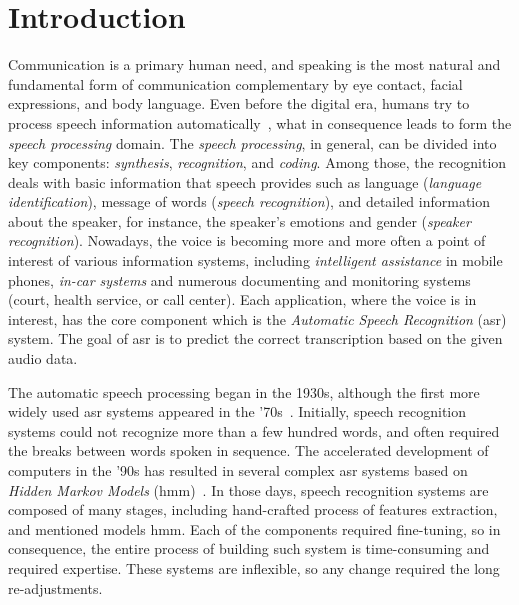 
\chapter{Introduction}\label{ch:introduction}

Communication is a primary human need, and speaking is the most natural
and fundamental form of communication complementary by eye contact, facial expressions, and body language.
Even before the digital era, humans try to process speech information automatically~\cite{juang2004,deller2000},
what in consequence leads to form the \textit{speech processing} domain.
The \textit{speech processing}, in general, can be divided into key components: \textit{synthesis},
\textit{recognition}, and \textit{coding}.
Among those, the recognition deals with basic information that speech provides such as
language (\textit{language identification}), message of words (\textit{speech recognition}), and
detailed information about the speaker, for instance, the speaker's emotions and gender (\textit{speaker recognition}).
Nowadays, the voice is becoming more and more often a point of interest of various information systems,
including \textit{intelligent assistance} in mobile phones, \textit{in-car systems} and numerous
documenting and monitoring systems (court, health service, or call center).
Each application, where the voice is in interest, has the core component which is
the \textit{Automatic Speech Recognition} (\acrshort{asr}) system.
The goal of \acrshort{asr} is to predict the correct transcription based on the given audio data.

The automatic speech processing began in the 1930s, although the first
more widely used \acrshort{asr} systems appeared in the '70s~\cite{juang2004,lowerre1976}.
Initially, speech recognition systems could not recognize more than a few hundred words, and
often required the breaks between words spoken in sequence.
The accelerated development of computers in the '90s has resulted in several complex \acrshort{asr} systems
based on \textit{Hidden Markov Models} (\acrshort{hmm})~\cite{juang2004}.
In those days, speech recognition systems are composed of many stages, including
hand-crafted process of features extraction, and mentioned models \acrshort{hmm}.
Each of the components required fine-tuning, so in consequence, the entire process of building
such system is time-consuming and required expertise.
These systems are inflexible, so any change required the long re-adjustments.

